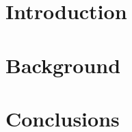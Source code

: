 \documentclass[twoside,11pt]{report}
\begin{document}

\tableofcontents

\chapter{Introduction}
%
\chapter{Background}

\chapter{Conclusions}


\end{document}
